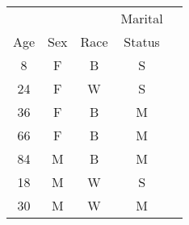 % 
\begin{tabular}{ccccc}
     &     &      & Marital \\
 Age & Sex & Race & Status \\
 8  & F  & B   & S  \\
 24  & F  & W   & S  \\
 36  & F  & B   & M  \\
 66  & F  & B   & M  \\
 84  & M  & B   & M  \\
 18  & M  & W   & S  \\
 30  & M  & W   & M  \\
\hline
\end{tabular}
